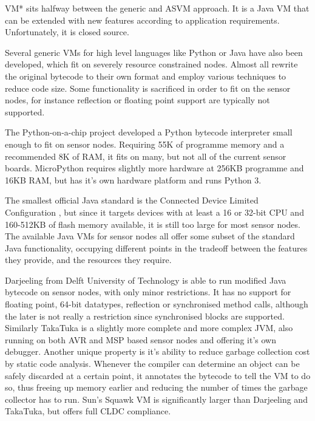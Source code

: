 VM* \cite{Koshy:2005ww} sits halfway between the generic and ASVM approach. It is a Java VM that can be extended with new features according to application requirements. Unfortunately, it is closed source.

Several generic VMs for high level languages like Python or Java have also been developed, which fit on severely resource constrained nodes. Almost all rewrite the original bytecode to their own format and employ various techniques to reduce code size. Some functionality is sacrificed in order to fit on the sensor nodes, for instance reflection or floating point support are typically not supported.

The Python-on-a-chip project \cite{python-on-a-chip} developed a Python bytecode interpreter small enough to fit on sensor nodes. Requiring 55K of programme memory and a recommended 8K of RAM, it fits on many, but not all of the current sensor boards. MicroPython \cite{micropython} requires slightly more hardware at 256KB programme and 16KB RAM, but has it's own hardware platform and runs Python 3.

The smallest official Java standard is the Connected Device Limited Configuration \cite{CLDC}, but since it targets devices with at least a 16 or 32-bit CPU and 160-512KB of flash memory available, it is still too large for most sensor nodes. The available Java VMs for sensor nodes all offer some subset of the standard Java functionality, occupying different points in the tradeoff between the features they provide, and the resources they require.

Darjeeling \cite{Brouwers:2009cj} from Delft University of Technology is able to run modified Java bytecode on sensor nodes, with only minor restrictions. It has no support for floating point, 64-bit datatypes, reflection or synchronised method calls, although the later is not really a restriction since synchronised blocks are supported. Similarly TakaTuka \cite{Aslam:2008} is a slightly more complete and more complex JVM, also running on both AVR and MSP based sensor nodes and offering it's own debugger. Another unique property is it's ability to reduce garbage collection cost by static code analysis. Whenever the compiler can determine an object can be safely discarded at a certain point, it annotates the bytecode to tell the VM to do so, thus freeing up memory earlier and reducing the number of times the garbage collector has to run. Sun's Squawk VM \cite{Shaylor:2003ws} is significantly larger than Darjeeling and TakaTuka, but offers full CLDC compliance.

